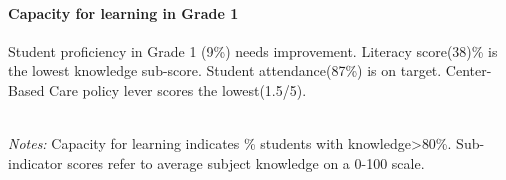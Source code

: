 \documentclass[twocolumn]{article}
\let\oldparagraph\paragraph
\renewcommand{\paragraph}[1]{\oldparagraph{#1}\mbox{}}
\begin{document}
\hypertarget{capacity-for-learning-in-grade-1}{%
\paragraph{\texorpdfstring{\textbf{Capacity for learning in Grade
1}}{Capacity for learning in Grade 1}}\label{capacity-for-learning-in-grade-1}}

Student proficiency in Grade 1 (9\%) needs improvement. Literacy
score(38)\% is the lowest knowledge sub-score. Student attendance(87\%)
is on target. Center-Based Care policy lever scores the lowest(1.5/5).

\begin{table}[H]
\\
\color{darkgray}\scriptsize{\textit{Notes:} Capacity for learning indicates \% students with knowledge\textgreater{80\%}. Sub-indicator scores refer to average subject knowledge on a 0-100 scale.}
\end{table}
\vfill\null
\end{document}
